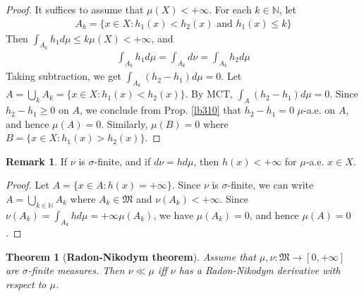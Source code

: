 \documentclass[12pt,b5paper,notitlepage]{article}
\theoremstyle{definition}
\newtheorem{rem}[df]{Remark}
\theoremstyle{plain}
\newtheorem{thm}[df]{Theorem}
\newcommand{\fk}{\mathfrak}
\newcommand{\Nbb}{\mathbb N}
\numberwithin{equation}{section}
\begin{document}
\begin{proof}
It suffices to assume that $\mu(X)<+\infty$. For each $k\in\Nbb$, let
\begin{align*}
A_k=\{x\in X:h_1(x)<h_2(x)\text{ and }h_1(x)\leq k\}
\end{align*}
Then $\int_{A_k} h_1d\mu\leq k\mu(X)<+\infty$, and
\begin{align*}
\int_{A_k} h_1d\mu=\int_{A_k} d\nu=\int_{A_k}h_2d\mu
\end{align*}
Taking subtraction, we get $\int_{A_k}(h_2-h_1)d\mu=0$. Let $A=\bigcup_k A_k=\{x\in X:h_1(x)<h_2(x)\}$. By MCT,  $\int_A(h_2-h_1)d\mu=0$. Since $h_2-h_1\geq0$ on $A$, we conclude from Prop. \ref{lb310} that $h_2-h_1=0$ $\mu$-a.e. on $A$, and hence $\mu(A)=0$. Similarly, $\mu(B)=0$ where $B=\{x\in X:h_1(x)>h_2(x)\}$.
\end{proof}

\begin{rem}
If $\nu$ is $\sigma$-finite, and if $d\nu=hd\mu$, then $h(x)<+\infty$ for $\mu$-a.e. $x\in X$. 
\end{rem}

\begin{proof}
Let $A=\{x\in A:h(x)=+\infty\}$. Since $\nu$ is $\sigma$-finite, we can write $A=\bigcup_{k\in\Nbb}A_k$ where $A_k\in\fk M$ and $\nu(A_k)<+\infty$. Since $\nu(A_k)=\int_{A_k}hd\mu=+\infty \mu(A_k)$, we have $\mu(A_k)=0$, and hence $\mu(A)=0$.
\end{proof}





\begin{thm}[\textbf{Radon-Nikodym theorem}]\label{lb27} 
Assume that $\mu,\nu:\fk M\rightarrow[0,+\infty]$ are $\sigma$-finite measures. Then $\nu\ll\mu$ iff $\nu$ has a Radon-Nikodym derivative with respect to $\mu$.
\end{thm}
\end{document}
